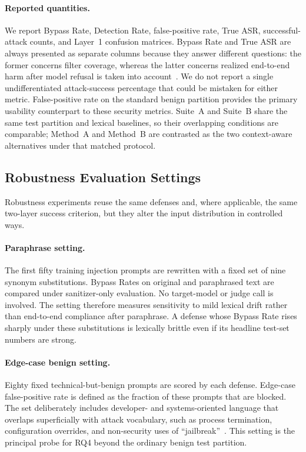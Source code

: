 ﻿\documentclass[10pt]{article}
\begin{document}
\paragraph{Reported quantities.}
We report Bypass Rate, Detection Rate, false-positive rate, True ASR, successful-attack counts, and Layer~1 confusion matrices.
Bypass Rate and True ASR are always presented as separate columns because they answer different questions: the former concerns filter coverage, whereas the latter concerns realized end-to-end harm after model refusal is taken into account~\cite{zizzo2025adversarial,yi2024jailbreak}.
We do not report a single undifferentiated attack-success percentage that could be mistaken for either metric.
False-positive rate on the standard benign partition provides the primary usability counterpart to these security metrics.
Suite~A and Suite~B share the same test partition and lexical baselines, so their overlapping conditions are comparable; Method~A and Method~B are contrasted as the two context-aware alternatives under that matched protocol.

\subsection{Robustness Evaluation Settings}
\label{sec:robustness-setup}

Robustness experiments reuse the same defenses and, where applicable, the same two-layer success criterion, but they alter the input distribution in controlled ways.

\paragraph{Paraphrase setting.}
The first fifty training injection prompts are rewritten with a fixed set of nine synonym substitutions.
Bypass Rates on original and paraphrased text are compared under sanitizer-only evaluation.
No target-model or judge call is involved.
The setting therefore measures sensitivity to mild lexical drift rather than end-to-end compliance after paraphrase.
A defense whose Bypass Rate rises sharply under these substitutions is lexically brittle even if its headline test-set numbers are strong.

\paragraph{Edge-case benign setting.}
Eighty fixed technical-but-benign prompts are scored by each defense.
Edge-case false-positive rate is defined as the fraction of these prompts that are blocked.
The set deliberately includes developer- and systems-oriented language that overlaps superficially with attack vocabulary, such as process termination, configuration overrides, and non-security uses of ``jailbreak''~\cite{bair2025prompt}.
This setting is the principal probe for RQ4 beyond the ordinary benign test partition.
\end{document}
